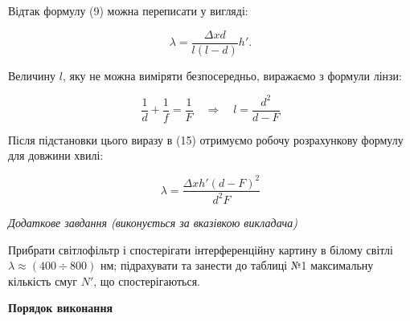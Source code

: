 \documentclass[12pt,a4paper]{article}
\begin{document}
    Відтак формулу (9) можна переписати у вигляді:

    \begin{equation}
        \lambda = \frac{\Delta xd}{l(l-d)}h'.
        \tag{15}
    \end{equation}

    Величину $l$, яку не можна виміряти безпосередньо, виражаємо з формули лінзи:

    \begin{equation}
        \frac{1}{d} + \frac{1}{f} = \frac{1}{F} \quad \Rightarrow \quad l = \frac{d^2}{d - F}
        \tag{16}
    \end{equation}

    Після підстановки цього виразу в (15) отримуємо робочу розрахункову формулу для довжини хвилі:

    \begin{equation}
        \lambda = \frac{\Delta xh' \left( d - F \right)^2}{d^2 F}
        \tag{17}
    \end{equation}

    \begin{center} \textit{Додаткове завдання (виконується за вказівкою викладача)} \end{center}

    Прибрати світлофільтр і спостерігати інтерференційну картину в білому
    світлі $\lambda \approx (400 \div 800)$ нм;
    підрахувати та занести до таблиці №1 максимальну кількість смуг $N'$, що спостерігаються.

    \newpage

    \begin{center} \textbf{Порядок виконання} \end{center}
\end{document}
